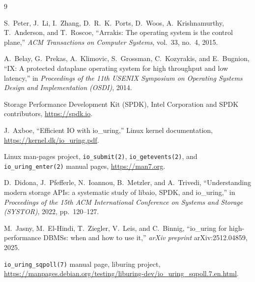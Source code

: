 \documentclass[conference]{IEEEtran}
\begin{document}
\begin{thebibliography}{9}

S.~Peter, J.~Li, I.~Zhang, D.~R.~K.~Ports, D.~Woos, A.~Krishnamurthy, T.~Anderson, and
T.~Roscoe, ``Arrakis: The operating system is the control plane,'' \textit{ACM Transactions on
Computer Systems}, vol.~33, no.~4, 2015.

A.~Belay, G.~Prekas, A.~Klimovic, S.~Grossman, C.~Kozyrakis, and E.~Bugnion, ``IX: A protected
dataplane operating system for high throughput and low latency,'' in \textit{Proceedings of the
11th USENIX Symposium on Operating Systems Design and Implementation (OSDI)}, 2014.

Storage Performance Development Kit (SPDK), Intel Corporation and SPDK contributors,
\url{https://spdk.io}.

J.~Axboe, ``Efficient IO with io\_uring,'' Linux kernel documentation,
\url{https://kernel.dk/io_uring.pdf}.

Linux man-pages project, \texttt{io\_submit(2)}, \texttt{io\_getevents(2)}, and
\texttt{io\_uring\_enter(2)} manual pages, \url{https://man7.org}.

D.~Didona, J.~Pfefferle, N.~Ioannou, B.~Metzler, and A.~Trivedi, ``Understanding modern storage
APIs: a systematic study of libaio, SPDK, and io\_uring,'' in \textit{Proceedings of the 15th ACM
International Conference on Systems and Storage (SYSTOR)}, 2022, pp.~120--127.

M.~Jasny, M.~El-Hindi, T.~Ziegler, V.~Leis, and C.~Binnig, ``io\_uring for high-performance DBMSs:
when and how to use it,'' \textit{arXiv preprint} arXiv:2512.04859, 2025.

\texttt{io\_uring\_sqpoll(7)} manual page, liburing project,
\url{https://manpages.debian.org/testing/liburing-dev/io_uring_sqpoll.7.en.html}.

\end{thebibliography}
\end{document}
